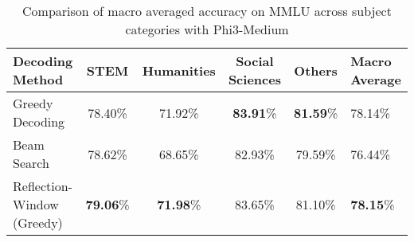 \begingroup
\renewcommand{\arraystretch}{1}
\begin{table*}[t]
    \caption{%
        Comparison of macro averaged accuracy on MMLU across subject categories with Phi3-Medium}
    \label{tab:mmlu_category_phi3}
    \centering
    \footnotesize
    \begin{tabular}{L{0.24}C{0.13}C{0.15}C{0.15}C{0.13}g}
        \toprule
        \textbf{Decoding Method}   & \textbf{STEM}    & \textbf{Humanities} & \textbf{Social Sciences} & \textbf{Others}  & \textbf{Macro Average} \\
        \midrule
        Greedy Decoding            & 78.40\%          & 71.92\%             & \textbf{83.91}\%         & \textbf{81.59}\% & 78.14\%                \\
        Beam Search                & 78.62\%          & 68.65\%             & 82.93\%                  & 79.59\%          & 76.44\%                \\
        Reflection-Window (Greedy) & \textbf{79.06}\% & \textbf{71.98}\%    & 83.65\%                  & 81.10\%          & \textbf{78.15}\%       \\
        \bottomrule
    \end{tabular}
\end{table*}
\endgroup



